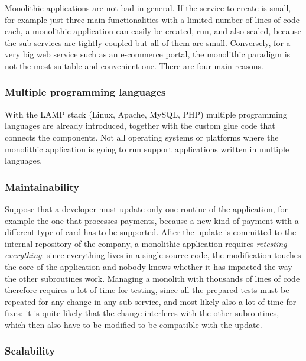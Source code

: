 Monolithic applications are not bad in general. If the service to create is small, for example just three main functionalities with a limited number of lines of code each, a monolithic application can easily be created, run, and also scaled, because the sub-services are tightly coupled but all of them are small. Conversely, for a very big web service such as an e-commerce portal, the monolithic paradigm is not the most suitable and convenient one. There are four main reasons.

\subsubsection*{Multiple programming languages}

With the LAMP stack (Linux, Apache, MySQL, PHP) multiple programming languages are already introduced, together with the custom glue code that connects the components. Not all operating systems or platforms where the monolithic application is going to run support applications written in multiple languages.

\subsubsection*{Maintainability}

Suppose that a developer must update only one routine of the application, for example the one that processes payments, because a new kind of payment with a different type of card has to be supported. After the update is committed to the internal repository of the company, a monolithic application requires \emph{retesting everything}: since everything lives in a single source code, the modification touches the core of the application and nobody knows whether it has impacted the way the other subroutines work. Managing a monolith with thousands of lines of code therefore requires a lot of time for testing, since all the prepared tests must be repeated for any change in any sub-service, and most likely also a lot of time for fixes: it is quite likely that the change interferes with the other subroutines, which then also have to be modified to be compatible with the update.

\subsubsection*{Scalability}


